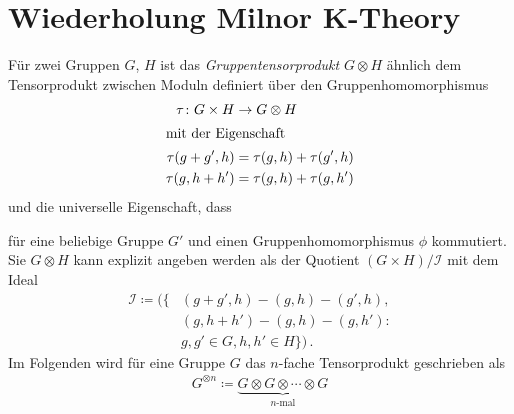 \documentclass[ngerman,fontsize=11pt, paper=a4, parskip=half, titlepage=true, toc=bib]{scrartcl}
\begin{document}
\maketitle
\tableofcontents




\section{Wiederholung Milnor K-Theory}

\begin{Bem}[Gruppentensorprodukt]
  Für zwei Gruppen $G$, $H$ ist das 
  \emph{Gruppentensorprodukt} $G\otimes H$ 
  ähnlich dem Tensorprodukt zwischen Moduln definiert
  über den Gruppenhomomorphismus
  \begin{align*}
    \tau\colon G\times H&\rightarrow G\otimes H\\
    \intertext{mit der Eigenschaft}
    \tau(g+g',h) &= \tau(g,h)+\tau(g',h)\\
    \tau(g,h+h') &= \tau(g,h)+\tau(g,h')
  \end{align*}
  und die universelle Eigenschaft, dass
  \begin{center}
  \end{center}
  für eine beliebige Gruppe $G'$ und einen Gruppenhomomorphismus $\phi$
  kommutiert.
  Sie $G\otimes H$ kann explizit angeben werden als der Quotient
  $(G\times H) / \mathcal{I}$ mit dem Ideal 
  \begin{align*}
    \mathcal{I}\coloneqq \big(
    \big\{&(g+g',h)-(g,h)-(g',h), \\
          &(g,h+h')-(g,h)-(g,h') \colon\\
          &g,g'\in G, h,h'\in H \big\}
            \big)\,.
  \end{align*}
  Im Folgenden wird für eine Gruppe $G$ das $n$-fache Tensorprodukt
  geschrieben als
  \begin{gather*}
    G^{\otimes n}
    \coloneqq \underbrace{G\otimes G\otimes\dotsb\otimes G}_{n\text{-mal}}
  \end{gather*}
\end{Bem}
\end{document}
